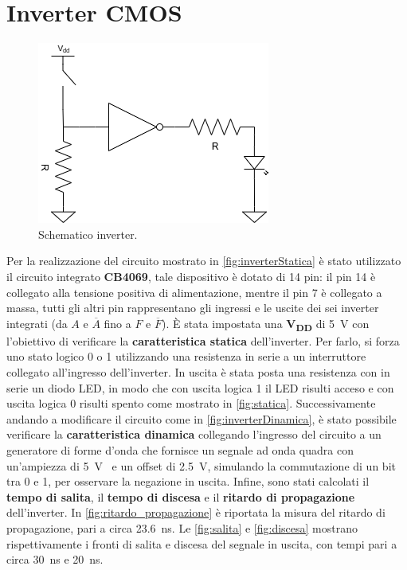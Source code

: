 \documentclass[a4paper,12pt]{article}
\begin{document}


\section*{Inverter CMOS}
\begin{figure}[H]
	\centering
	\includegraphics[width=0.5\linewidth]{immagini/inverter/circuitoLogico1Led.png}
	\caption{Schematico inverter.}
	\label{fig:inverterStatica}
\end{figure}
Per la realizzazione del circuito mostrato in \autoref{fig:inverterStatica} è stato utilizzato il circuito integrato \textbf{CB4069}, tale dispositivo è dotato di 14 pin: il pin 14 è collegato alla tensione positiva di alimentazione, mentre il pin 7 è collegato a massa, tutti gli altri pin rappresentano gli ingressi e le uscite dei sei inverter integrati (da $A$ e $\overline{A}$ fino a $F$ e $\overline{F}$).
È stata impostata una \textbf{V\textsubscript{DD}} di \SI{5}{\volt} con l’obiettivo di verificare la \textbf{caratteristica statica} dell’inverter. 
Per farlo, si forza uno stato logico 0 o 1 utilizzando una resistenza in serie a un interruttore collegato all’ingresso dell’inverter. 
In uscita è stata posta una resistenza con in serie un diodo LED, in modo che con uscita logica 1 il LED risulti acceso e con uscita logica 0 risulti spento come mostrato in \autoref{fig:statica}.
Successivamente andando a modificare il circuito come in \autoref{fig:inverterDinamica}, è stato possibile verificare la \textbf{caratteristica dinamica} collegando l’ingresso del circuito a un generatore di forme d’onda che fornisce un segnale ad onda quadra con un’ampiezza di \SI{5}{\volt{}} e un offset di \SI{2.5}{\volt}, simulando la commutazione di un bit tra 0 e 1, per osservare la negazione in uscita. 
Infine, sono stati calcolati il \textbf{tempo di salita}, il \textbf{tempo di discesa} e il \textbf{ritardo di propagazione} dell’inverter. 
In \autoref{fig:ritardo_propagazione} è riportata la misura del ritardo di propagazione, pari a circa \SI{23.6}{\nano\second}. 
Le \autoref{fig:salita} e \autoref{fig:discesa} mostrano rispettivamente i fronti di salita e discesa del segnale in uscita, con tempi pari a circa \SI{30}{\nano\second} e \SI{20}{\nano\second}. 
\end{document}
